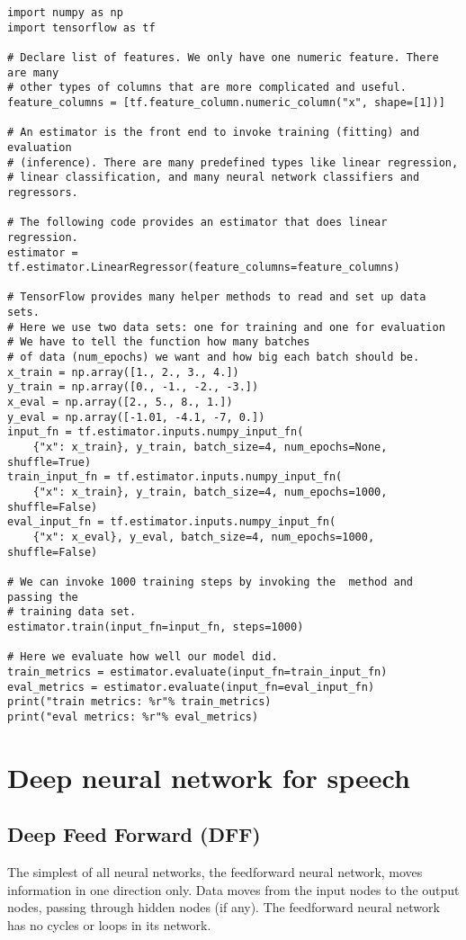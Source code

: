 \begin{adjustbox}{width=\textwidth}
\begin{lstlisting}
import numpy as np
import tensorflow as tf

# Declare list of features. We only have one numeric feature. There are many
# other types of columns that are more complicated and useful.
feature_columns = [tf.feature_column.numeric_column("x", shape=[1])]

# An estimator is the front end to invoke training (fitting) and evaluation
# (inference). There are many predefined types like linear regression,
# linear classification, and many neural network classifiers and regressors.

# The following code provides an estimator that does linear regression.
estimator = tf.estimator.LinearRegressor(feature_columns=feature_columns)

# TensorFlow provides many helper methods to read and set up data sets.
# Here we use two data sets: one for training and one for evaluation
# We have to tell the function how many batches
# of data (num_epochs) we want and how big each batch should be.
x_train = np.array([1., 2., 3., 4.])
y_train = np.array([0., -1., -2., -3.])
x_eval = np.array([2., 5., 8., 1.])
y_eval = np.array([-1.01, -4.1, -7, 0.])
input_fn = tf.estimator.inputs.numpy_input_fn(
    {"x": x_train}, y_train, batch_size=4, num_epochs=None, shuffle=True)
train_input_fn = tf.estimator.inputs.numpy_input_fn(
    {"x": x_train}, y_train, batch_size=4, num_epochs=1000, shuffle=False)
eval_input_fn = tf.estimator.inputs.numpy_input_fn(
    {"x": x_eval}, y_eval, batch_size=4, num_epochs=1000, shuffle=False)

# We can invoke 1000 training steps by invoking the  method and passing the
# training data set.
estimator.train(input_fn=input_fn, steps=1000)

# Here we evaluate how well our model did.
train_metrics = estimator.evaluate(input_fn=train_input_fn)
eval_metrics = estimator.evaluate(input_fn=eval_input_fn)
print("train metrics: %r"% train_metrics)
print("eval metrics: %r"% eval_metrics)
\end{lstlisting}
\end{adjustbox}

\section{Deep neural network for speech}
\subsection{Deep Feed Forward (DFF)}
The simplest of all neural networks, the feedforward neural network, moves information in one direction only.
Data moves from the input nodes to the output nodes,
passing through hidden nodes (if any).
The feedforward neural network has no cycles or loops in its network.

